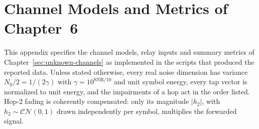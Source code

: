 \section{Channel Models and Metrics of Chapter~6}\label{sec:appendix-g-channel-specs}

This appendix specifies the channel models, relay inputs and summary metrics of Chapter~\ref{sec:unknown-channels} as implemented in the scripts that produced the reported data. Unless stated otherwise, every real noise dimension has variance $N_0/2 = 1/(2\gamma)$ with $\gamma = 10^{\mathrm{SNR}/10}$ and unit symbol energy, every tap vector is normalized to unit energy, and the impairments of a hop act in the order listed. Hop-2 fading is coherently compensated: only its magnitude $|h_2| $, with $h_2 \sim \mathcal{CN}(0,1)$ drawn independently per symbol, multiplies the forwarded signal.


